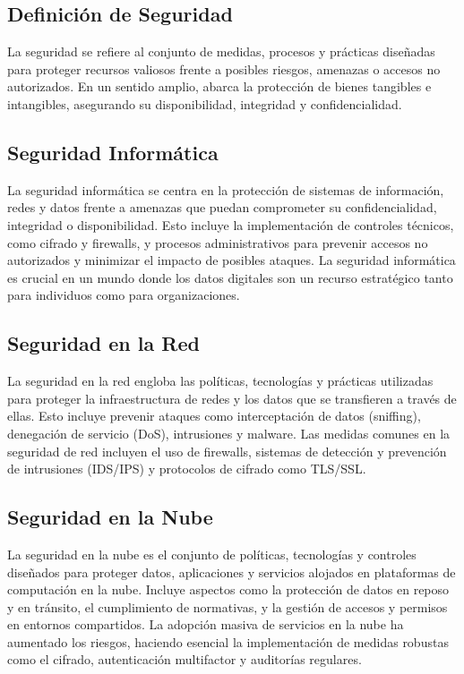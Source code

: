 \documentclass{article}
\begin{document}
    \subsection{Definición de Seguridad}
    La seguridad se refiere al conjunto de medidas, procesos y prácticas diseñadas para proteger recursos valiosos frente a posibles riesgos, amenazas o accesos no autorizados. En un sentido amplio, abarca la protección de bienes tangibles e intangibles, asegurando su disponibilidad, integridad y confidencialidad.

    \subsection{Seguridad Informática}
    La seguridad informática se centra en la protección de sistemas de información, redes y datos frente a amenazas que puedan comprometer su confidencialidad, integridad o disponibilidad. Esto incluye la implementación de controles técnicos, como cifrado y firewalls, y procesos administrativos para prevenir accesos no autorizados y minimizar el impacto de posibles ataques. La seguridad informática es crucial en un mundo donde los datos digitales son un recurso estratégico tanto para individuos como para organizaciones.

    \subsection{Seguridad en la Red}
    La seguridad en la red engloba las políticas, tecnologías y prácticas utilizadas para proteger la infraestructura de redes y los datos que se transfieren a través de ellas. Esto incluye prevenir ataques como interceptación de datos (sniffing), denegación de servicio (DoS), intrusiones y malware. Las medidas comunes en la seguridad de red incluyen el uso de firewalls, sistemas de detección y prevención de intrusiones (IDS/IPS) y protocolos de cifrado como TLS/SSL.

    \subsection{Seguridad en la Nube}
    La seguridad en la nube es el conjunto de políticas, tecnologías y controles diseñados para proteger datos, aplicaciones y servicios alojados en plataformas de computación en la nube. Incluye aspectos como la protección de datos en reposo y en tránsito, el cumplimiento de normativas, y la gestión de accesos y permisos en entornos compartidos. La adopción masiva de servicios en la nube ha aumentado los riesgos, haciendo esencial la implementación de medidas robustas como el cifrado, autenticación multifactor y auditorías regulares.
\end{document}
